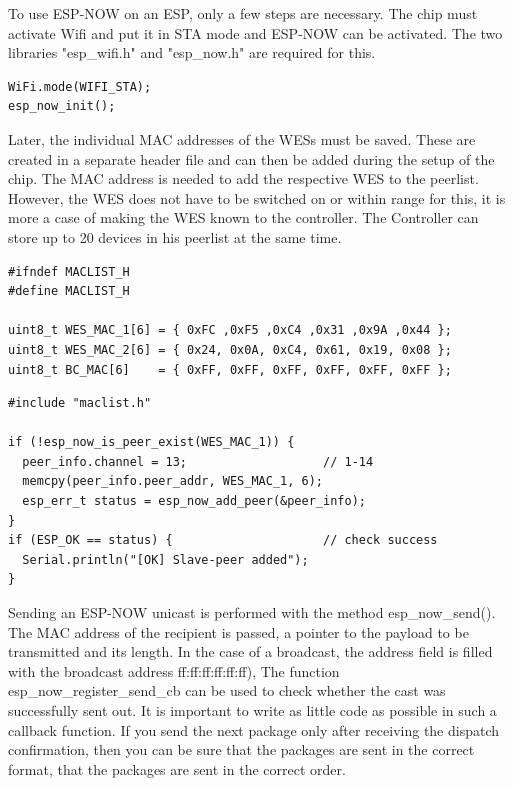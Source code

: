 To use ESP-NOW on an ESP, only a few steps are necessary.
The chip must activate Wifi and put it in STA mode and ESP-NOW can be activated.
The two libraries "esp\_wifi.h" and "esp\_now.h" are required for this.

\begin{lstlisting}[caption=Init ESP-NOW]
WiFi.mode(WIFI_STA);
esp_now_init();
\end{lstlisting}
\label{lst:init}

Later, the individual MAC addresses of the WESs must be saved.
These are created in a separate header file and can then be added during the setup of the chip.
The MAC address is needed to add the respective WES to the peerlist.
However, the WES does not have to be switched on or within range for this, it is more a case of making the WES known to the controller.
The Controller can store up to 20 devices in his peerlist at the same time.

\begin{lstlisting}
#ifndef MACLIST_H
#define MACLIST_H

uint8_t WES_MAC_1[6] = { 0xFC ,0xF5 ,0xC4 ,0x31 ,0x9A ,0x44 };
uint8_t WES_MAC_2[6] = { 0x24, 0x0A, 0xC4, 0x61, 0x19, 0x08 };
uint8_t BC_MAC[6]    = { 0xFF, 0xFF, 0xFF, 0xFF, 0xFF, 0xFF };
\end{lstlisting}
\label{lst:macaddress}
\begin{lstlisting}[caption=Add Peers]
#include "maclist.h"

if (!esp_now_is_peer_exist(WES_MAC_1)) {
  peer_info.channel = 13;                   // 1-14
  memcpy(peer_info.peer_addr, WES_MAC_1, 6);
  esp_err_t status = esp_now_add_peer(&peer_info);
}
if (ESP_OK == status) {                     // check success
  Serial.println("[OK] Slave-peer added"); 
}
\end{lstlisting}
\label{lst:addPeer}

Sending an ESP-NOW unicast is performed with the method esp\_now\_send().
The MAC address of the recipient is passed, a pointer to the payload to be transmitted and its length.
In the case of a broadcast, the address field is filled with the broadcast address ff:ff:ff:ff:ff:ff),
The function esp\_now\_register\_send\_cb can be used to check whether the cast was successfully sent out.
It is important to write as little code as possible in such a callback function.
If you send the next package only after receiving the dispatch confirmation, then you can be sure that the packages are sent in the correct format,
that the packages are sent in the correct order.

